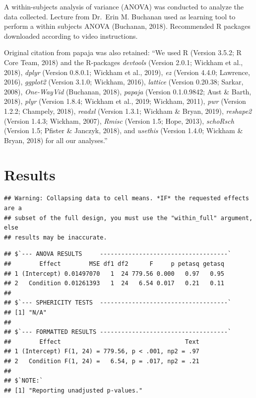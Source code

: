 \documentclass[man]{apa6}
\begin{document}
A within-subjects analysis of variance (ANOVA) was conducted to analyze the data collected. Lecture from Dr.~Erin M. Buchanan used as learning tool to perform a within subjects ANOVA (Buchanan, 2018). Recommended R packages downloaded according to video instructions.

Original citation from papaja was also retained: \enquote{We used R (Version 3.5.2; R Core Team, 2018) and the R-packages \emph{devtools} (Version 2.0.1; Wickham et al., 2018), \emph{dplyr} (Version 0.8.0.1; Wickham et al., 2019), \emph{ez} (Version 4.4.0; Lawrence, 2016), \emph{ggplot2} (Version 3.1.0; Wickham, 2016), \emph{lattice} (Version 0.20.38; Sarkar, 2008), \emph{One-WayVid} (Buchanan, 2018), \emph{papaja} (Version 0.1.0.9842; Aust \& Barth, 2018), \emph{plyr} (Version 1.8.4; Wickham et al., 2019; Wickham, 2011), \emph{pwr} (Version 1.2.2; Champely, 2018), \emph{readxl} (Version 1.3.1; Wickham \& Bryan, 2019), \emph{reshape2} (Version 1.4.3; Wickham, 2007), \emph{Rmisc} (Version 1.5; Hope, 2013), \emph{schoRsch} (Version 1.5; Pfister \& Janczyk, 2018), and \emph{usethis} (Version 1.4.0; Wickham \& Bryan, 2018) for all our analyses.}

\hypertarget{results}{%
\section{Results}\label{results}}

\begin{verbatim}
## Warning: Collapsing data to cell means. *IF* the requested effects are a
## subset of the full design, you must use the "within_full" argument, else
## results may be inaccurate.
\end{verbatim}

\begin{verbatim}
## $`--- ANOVA RESULTS     ------------------------------------`
##        Effect        MSE df1 df2      F     p petasq getasq
## 1 (Intercept) 0.01497070   1  24 779.56 0.000   0.97   0.95
## 2   Condition 0.01261393   1  24   6.54 0.017   0.21   0.11
## 
## $`--- SPHERICITY TESTS  ------------------------------------`
## [1] "N/A"
## 
## $`--- FORMATTED RESULTS ------------------------------------`
##        Effect                                   Text
## 1 (Intercept) F(1, 24) = 779.56, p < .001, np2 = .97
## 2   Condition F(1, 24) =   6.54, p = .017, np2 = .21
## 
## $`NOTE:`
## [1] "Reporting unadjusted p-values."
\end{verbatim}
\end{document}
